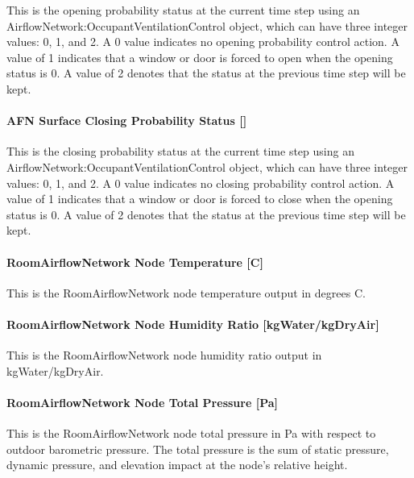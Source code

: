 This is the opening probability status at the current time step using an AirflowNetwork:OccupantVentilationControl object, which can have three integer values: 0, 1, and 2. A 0 value indicates no opening probability control action. A value of 1 indicates that a window or door is forced to open when the opening status is 0. A value of 2 denotes that the status at the previous time step will be kept.

\paragraph{AFN Surface Closing Probability Status {[]}}\label{afn-surface-closing-probability-status}

This is the closing probability status at the current time step using an AirflowNetwork:OccupantVentilationControl object, which can have three integer values: 0, 1, and 2. A 0 value indicates no closing probability control action. A value of 1 indicates that a window or door is forced to close when the opening status is 0. A value of 2 denotes that the status at the previous time step will be kept.

\paragraph{RoomAirflowNetwork Node Temperature {[}C{]}}\label{roomairflownetwork-node-temperature-c}

This is the RoomAirflowNetwork node temperature output in degrees C.

\paragraph{RoomAirflowNetwork Node Humidity Ratio {[}kgWater/kgDryAir{]}}\label{roomairflownetwork-node-humidity-ratio-kgwaterkgdryair}

This is the RoomAirflowNetwork node humidity ratio output in kgWater/kgDryAir.

\paragraph{RoomAirflowNetwork Node Total Pressure {[}Pa{]}}\label{roomairflownetwork-node-total-pressure-pa}

This is the RoomAirflowNetwork node total pressure in Pa with respect to outdoor barometric pressure. The total pressure is the sum of static pressure, dynamic pressure, and elevation impact at the node's relative height.

